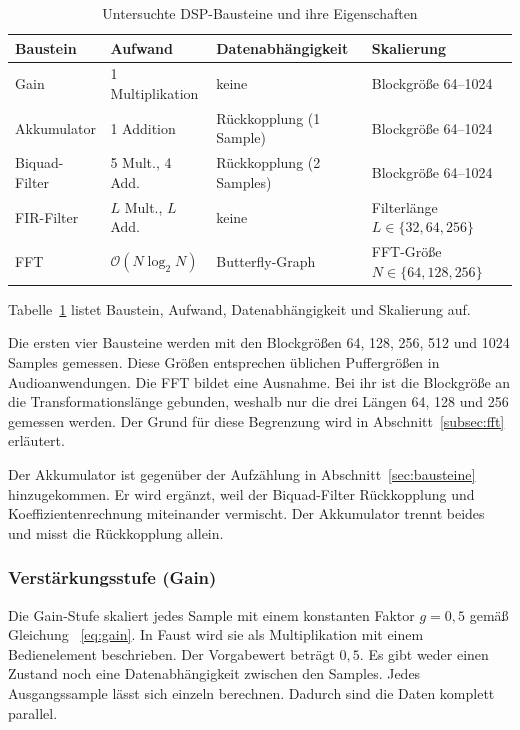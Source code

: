 \begin{table}[htb]
	\centering
	\small
	\caption{Untersuchte DSP-Bausteine und ihre Eigenschaften}
	\label{tab:bausteine}
	\begin{tabularx}{\textwidth}{@{} l l l X @{}}
		\toprule
		\textbf{Baustein} & \textbf{Aufwand} & \textbf{Datenabhängigkeit} & \textbf{Skalierung} \\
		\midrule
		Gain          & 1 Multiplikation        & keine                    & Blockgröße 64--1024 \\
		Akkumulator   & 1 Addition              & Rückkopplung (1 Sample)  & Blockgröße 64--1024 \\
		Biquad-Filter & 5 Mult., 4 Add.         & Rückkopplung (2 Samples) & Blockgröße 64--1024 \\
		FIR-Filter    & $L$ Mult., $L$ Add.     & keine                    & Filterlänge $L \in \{32, 64, 256\}$ \\
		FFT           & $\mathcal{O}(N\log_2 N)$ & Butterfly-Graph          & FFT-Größe $N \in \{64, 128, 256\}$ \\
		\bottomrule
	\end{tabularx}
\end{table}

Tabelle~\ref{tab:bausteine} listet Baustein, Aufwand, Datenabhängigkeit und Skalierung auf.

Die ersten vier Bausteine werden mit den Blockgrößen 64, 128, 256, 512 und
1024 Samples gemessen. Diese Größen entsprechen üblichen Puffergrößen in
Audioanwendungen. Die FFT bildet eine Ausnahme. Bei ihr ist die Blockgröße an
die Transformationslänge gebunden, weshalb nur die drei Längen 64, 128 und
256 gemessen werden. Der Grund für diese Begrenzung wird in
Abschnitt~\ref{subsec:fft} erläutert.

Der Akkumulator ist gegenüber der Aufzählung in Abschnitt~\ref{sec:bausteine} hinzugekommen.
Er wird ergänzt, weil der Biquad-Filter Rückkopplung und
Koeffizientenrechnung miteinander vermischt. Der Akkumulator trennt beides
und misst die Rückkopplung allein.

\subsubsection*{Verstärkungsstufe (Gain)}

Die Gain-Stufe skaliert jedes Sample mit einem konstanten Faktor $ g = 0{,}5$ gemäß Gleichung ~\ref{eq:gain}. In Faust wird sie als Multiplikation mit einem Bedienelement beschrieben. Der Vorgabewert beträgt $0{,}5$. Es gibt weder einen Zustand noch eine Datenabhängigkeit zwischen
den Samples. Jedes Ausgangssample lässt sich einzeln berechnen. Dadurch sind die Daten komplett parallel.

